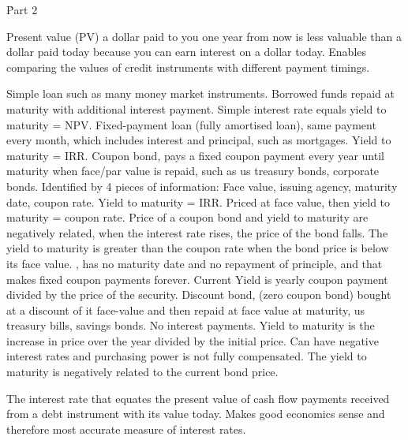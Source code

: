\documentclass[12pt]{examnotes}
\begin{document}
\h{Part 2}


\ra Present value (PV) a dollar paid to you one year from now is less valuable than a dollar paid today because you can earn interest on a dollar today. Enables comparing the values of credit instruments with different payment timings.

 Simple loan such as many money market instruments.  Borrowed funds repaid at maturity with additional interest payment. 
\rna Simple interest rate equals yield to maturity = NPV.
 Fixed-payment loan (fully amortised loan), same payment every month, which includes interest and principal, such as mortgages. 
\rna Yield to maturity = IRR.
 Coupon bond, pays a fixed coupon payment every year until maturity when face/par value is repaid, such as us treasury bonds, corporate bonds. Identified by 4 pieces of information: Face value, issuing agency, maturity date, coupon rate. Yield to maturity = IRR. 
\rna Priced at face value, then yield to maturity = coupon rate.
\rna Price of a coupon bond and yield to maturity are negatively related, when the interest rate rises, the price of the bond falls. 
\rna The yield to  maturity is greater than the coupon rate when the bond price is below its face value. 
, has no maturity date and no repayment of principle, and that makes fixed coupon payments forever.
\rna Current Yield is yearly coupon payment divided by the price of the security.
 Discount bond, (zero coupon bond) bought at a discount of it face-value and then repaid at face value at maturity, us treasury bills, savings bonds. No interest payments.  
\rna Yield to maturity is the increase in price over the year divided by the initial price.
\rna Can have negative interest rates and purchasing power is not fully compensated.
\rna The yield to maturity is negatively related to the current bond price.

\ra The interest rate that equates the present value of cash flow payments received from a debt instrument with its value today.
\ra Makes good economics sense and therefore most accurate measure of interest rates.
\end{document}
